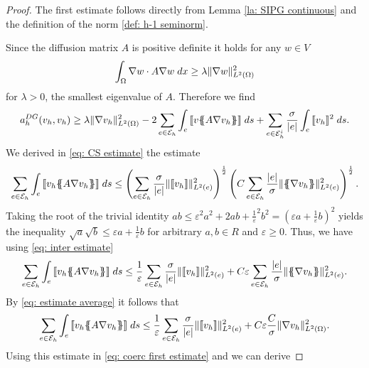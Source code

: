 \begin{proof}
	The first estimate follows directly from Lemma \ref{la: SIPG continuous} and the definition of the norm \ref{def: h-1 seminorm}. 
		
	Since the diffusion matrix $A$ is positive definite it holds for any $w \in V$
	\begin{align}
	\int_{\Omega} {{\nabla w \cdot A \nabla w}\;dx} \geq \lambda \lVert \nabla w  \rVert_{L^2(\Omega)}^2  \label{eq: estimate pos def}
	\end{align}
	for $\lambda >0$, the smallest eigenvalue of $A$.
	Therefore we find
	\begin{align}
	a_h^{DG}(v_h,v_h) \geq \lambda \lVert \nabla v_h \rVert_{L^2(\Omega)}^2 - 2 \sum\limits_{e \in \mathcal{E}_h}\int_{e} {{ \llbracket v \{\!\!\{ A \nabla v_h \}\!\!\}  \rrbracket}\;ds} + \sum_{e\in \mathcal{E}_h^i} \frac \sigma {|e|} \int_{e} {{\llbracket v_h \rrbracket^2}\;ds} .\label{eq: coerc first estimate}
	\end{align}
	We derived in \eqref{eq: CS estimate} the estimate 
	\begin{align}
	\sum\limits_{e \in \edges}\myIntS e { \jump {v_h \average{A \nabla v_h} }}
	\leq		\left( \sum\limits_{e \in \edges} \frac {\sigma}{|e|} \LTwonormE{\jump {v_h}}^2 \right)^{\frac 1 2}
	\left(C \sum\limits_{e \in \edges} \frac {|e|} \sigma \LTwonormE{\average{\nabla v_h}}^2 \right)^{\frac 1 2}. \label{eq: inter estimate}
	\end{align}
	Taking the root of the trivial identity $ab \leq \varepsilon^2 a^2 + 2ab + {\frac 1 \varepsilon}^2b^2 = \left( \varepsilon a + \frac 1 \varepsilon b\right)^2$ yields the inequality $\sqrt{a} \sqrt{b} \leq \varepsilon a + \frac 1 \varepsilon b$ for arbitrary $a,b \in R$ and $\varepsilon \geq 0$. Thus, we have using \eqref{eq: inter estimate}
	\begin{align*}
	\sum\limits_{e \in \edges}\myIntS e { \jump {v_h \average{A \nabla v_h} }} 
	\leq \frac 1 \varepsilon \sum\limits_{e \in \edges}\frac \sigma {|e|}\LTwonormE{\jump {v_h}}^2 
	+ C\varepsilon  \sum\limits_{e \in \edges}  \frac {|e|} \sigma \LTwonormE{\average{\nabla v_h}}^2.
	\end{align*}
	By \eqref{eq: estimate average} it follows that 
	\begin{align*}
		\sum\limits_{e \in \mathcal{E}_h}\int_{e} {{ \llbracket v_h \{\!\!\{ A \nabla v_h \}\!\!\}  \rrbracket}\;ds} 
		\leq \frac 1 \varepsilon \sum\limits_{e \in \mathcal{E}_h}\frac \sigma {|e|}\lVert \llbracket v_h \rrbracket \rVert_{L^2(e)}^2 
		+ C\varepsilon  \frac C \sigma \lVert \nabla v_h \rVert_{L^2(\Omega)}^2.
	\end{align*}			
	Using this estimate in \eqref{eq: coerc first estimate} and we can derive

\end{proof}

